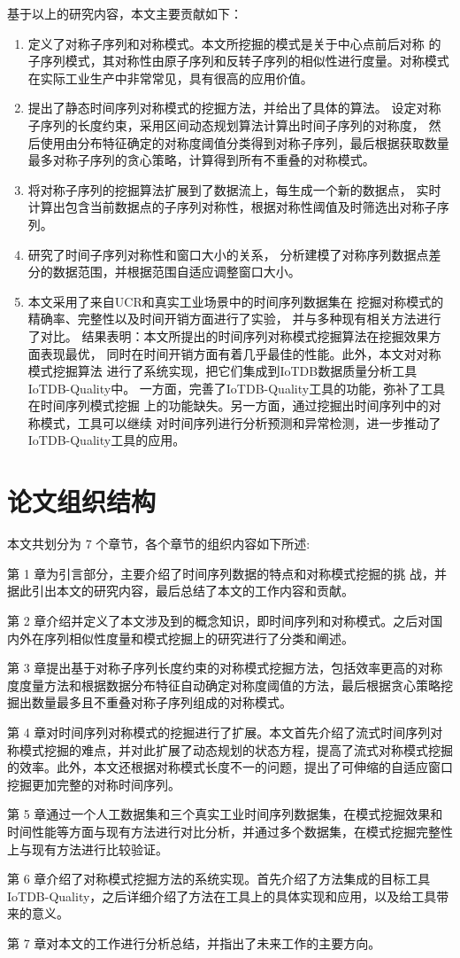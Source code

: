 基于以上的研究内容，本文主要贡献如下：
\begin{enumerate}
\item 定义了对称子序列和对称模式。本文所挖掘的模式是关于中心点前后对称
的子序列模式，其对称性由原子序列和反转子序列的相似性进行度量。对称模式
在实际工业生产中非常常见，具有很高的应用价值。
\item 提出了静态时间序列对称模式的挖掘方法，并给出了具体的算法。
设定对称子序列的长度约束，采用区间动态规划算法计算出时间子序列的对称度，
然后使用由分布特征确定的对称度阈值分类得到对称子序列，最后根据获取数量
最多对称子序列的贪心策略，计算得到所有不重叠的对称模式。
\item 将对称子序列的挖掘算法扩展到了数据流上，每生成一个新的数据点，
实时计算出包含当前数据点的子序列对称性，根据对称性阈值及时筛选出对称子序列。
\item 研究了时间子序列对称性和窗口大小的关系，
分析建模了对称序列数据点差分的数据范围，并根据范围自适应调整窗口大小。
\item 本文采用了来自UCR和真实工业场景中的时间序列数据集在
挖掘对称模式的精确率、完整性以及时间开销方面进行了实验，
并与多种现有相关方法进行了对比。
结果表明：本文所提出的时间序列对称模式挖掘算法在挖掘效果方面表现最优，
同时在时间开销方面有着几乎最佳的性能。此外，本文对对称模式挖掘算法
进行了系统实现，把它们集成到IoTDB数据质量分析工具IoTDB-Quality中。
一方面，完善了IoTDB-Quality工具的功能，弥补了工具在时间序列模式挖掘
上的功能缺失。另一方面，通过挖掘出时间序列中的对称模式，工具可以继续
对时间序列进行分析预测和异常检测，进一步推动了IoTDB-Quality工具的应用。
\end{enumerate}

\section{论文组织结构}

本文共划分为 7 个章节，各个章节的组织内容如下所述:

第 1 章为引言部分，主要介绍了时间序列数据的特点和对称模式挖掘的挑 战，并据此引出本文的研究内容，最后总结了本文的工作内容和贡献。

第 2 章介绍并定义了本文涉及到的概念知识，即时间序列和对称模式。之后对国内外在序列相似性度量和模式挖掘上的研究进行了分类和阐述。

第 3 章提出基于对称子序列长度约束的对称模式挖掘方法，包括效率更高的对称度度量方法和根据数据分布特征自动确定对称度阈值的方法，最后根据贪心策略挖掘出数量最多且不重叠对称子序列组成的对称模式。

第 4 章对时间序列对称模式的挖掘进行了扩展。本文首先介绍了流式时间序列对称模式挖掘的难点，并对此扩展了动态规划的状态方程，提高了流式对称模式挖掘的效率。此外，本文还根据对称模式长度不一的问题，提出了可伸缩的自适应窗口挖掘更加完整的对称时间序列。

第 5 章通过一个人工数据集和三个真实工业时间序列数据集，在模式挖掘效果和时间性能等方面与现有方法进行对比分析，并通过多个数据集，在模式挖掘完整性上与现有方法进行比较验证。

第 6 章介绍了对称模式挖掘方法的系统实现。首先介绍了方法集成的目标工具 IoTDB-Quality，之后详细介绍了方法在工具上的具体实现和应用，以及给工具带来的意义。

第 7 章对本文的工作进行分析总结，并指出了未来工作的主要方向。 
